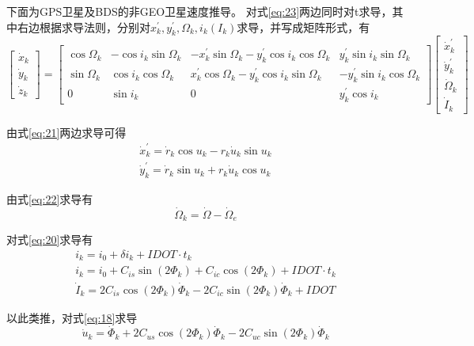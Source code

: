 \documentclass{ctexart}
\begin{document}
下面为GPS卫星及BDS的非GEO卫星速度推导。
对式\eqref{eq:23}两边同时对t求导，其中右边根据求导法则，分别对$x_k^{\prime},y_k^{\prime},\Omega_k,i_k(I_k)$求导，并写成矩阵形式，有
\begin{equation}
\begin{bmatrix}
\dot{x}_k\\
\dot{y}_k\\
\dot{z}_k
\end{bmatrix}=\begin{bmatrix}
\cos\Omega_k&-\cos i_k\sin\Omega_k&-x_k^{\prime}\sin\Omega_k-y_k^{\prime}\cos i_k\cos\Omega_k&y_k^{\prime}\sin i_k\sin\Omega_k\\
\sin\Omega_k&\cos i_k\cos\Omega_k&x_k^{\prime}\cos\Omega_k-y_k^{\prime}\cos i_k\sin\Omega_k&-y_k^{\prime}\sin i_k\cos\Omega_k\\
0&\sin i_k&0&y_k^{\prime}\cos i_k
\end{bmatrix}\begin{bmatrix}
\dot{x}_k^{\prime}\\
\dot{y}_k^{\prime}\\
\dot{\Omega}_k\\
\dot{I}_k
\end{bmatrix}
\label{eq:24}
\end{equation}

由式\eqref{eq:21}两边求导可得
\begin{equation}
\begin{gathered}
\dot{x}_k^{\prime}=\dot{r}_k\cos u_k-r_k\dot{u}_k\sin u_k\\
\dot{y}_k^{\prime}=\dot{r}_k\sin u_k+r_k\dot{u}_k\cos u_k
\end{gathered}
\end{equation}

由式\eqref{eq:22}求导有
\begin{equation}
\dot{\Omega}_k=\dot{\Omega}-\dot{\Omega}_e
\end{equation}

对式\eqref{eq:20}求导有
\begin{equation}
\begin{gathered}
i_k=i_0+\delta i_k+IDOT\cdot t_k\\
i_k=i_0+C_{is}\sin(2\Phi_k)+C_{ic}\cos(2\Phi_k)+IDOT\cdot t_k\\
\dot{I}_k=2C_{is}\cos(2\Phi_k)\dot{\Phi}_k-2C_{ic}\sin(2\Phi_k)\dot{\Phi}_k+IDOT
\end{gathered}
\end{equation}

以此类推，对式\eqref{eq:18}求导
\begin{equation}
\dot{u}_k=\dot{\Phi}_k+2C_{us}\cos(2\Phi_k)\dot{\Phi}_k-2C_{uc}\sin(2\Phi_k)\dot{\Phi}_k
\end{equation}
\end{document}
